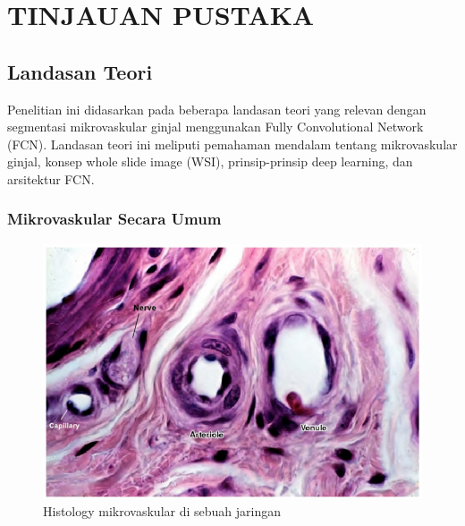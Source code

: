 \chapter{TINJAUAN PUSTAKA}


\section{Landasan Teori}
\noindent Penelitian ini didasarkan pada beberapa landasan teori yang relevan dengan segmentasi mikrovaskular ginjal menggunakan Fully Convolutional Network (FCN). Landasan teori ini meliputi pemahaman mendalam tentang mikrovaskular ginjal, konsep whole slide image (WSI), prinsip-prinsip deep learning, dan arsitektur FCN.

\subsection{Mikrovaskular Secara Umum}

\begin{figure}[H]
	\centering
	\includegraphics[scale=3]{gambar/mikrovaskular.jpg}
	\caption{Histology mikrovaskular di sebuah jaringan}
	\label{fig:mikrovaskular}
\end{figure}


